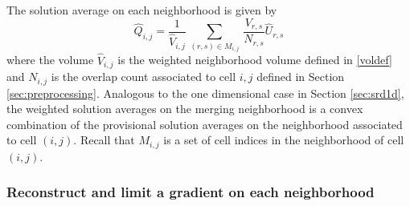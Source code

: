The solution average on each neighborhood is given by
\begin{equation}
\label{tiledef}
\widehat{Q}_{i,j} =  \frac{1}{{\widehat V}_{i,j}} \, \sum_{(r,s) \in M_{i,j}} \,  
\frac{V_{r,s}}{N_{r,s}}  \widehat{U}_{r,s}
\end{equation}
where the volume ${\widehat V}_{i,j}$ is the weighted neighborhood volume defined in \eqref{voldef} and $N_{i,j}$ is the overlap count associated to cell $i,j$ defined in Section \ref{sec:preprocessing}.  
Analogous to the one dimensional case in Section \ref{sec:srd1d}, the weighted solution averages on the merging neighborhood is a convex combination of the provisional solution averages on the neighborhood associated to cell $(i,j)$.  Recall that $M_{i,j}$ is a set of cell indices in the neighborhood of cell $(i,j)$.






\subsubsection*{Reconstruct and limit a gradient on each neighborhood}

